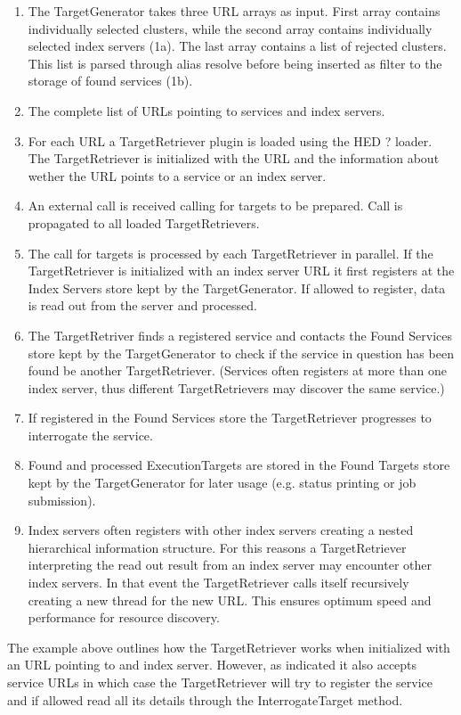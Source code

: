 \documentclass{book}
\begin{document}
\begin{enumerate}
\item{The TargetGenerator takes three URL arrays as input. First array contains individually selected clusters, while the 
second array contains individually selected index servers (1a). The last array contains a list of rejected clusters. This 
list is parsed through alias resolve before being inserted as filter to the storage of found services (1b).}
\item{The complete list of URLs pointing to services and index servers.}
\item{For each URL a TargetRetriever plugin is loaded using the HED ? loader. The TargetRetriever is initialized 
with the URL and the information about wether the URL points to a service or an index server.}
\item{An external call is received calling for targets to be prepared. Call is propagated to all loaded TargetRetrievers.}
\item{The call for targets is processed by each TargetRetriever in parallel. If the TargetRetriever is initialized with an 
index server URL it first registers at the Index Servers store kept by the TargetGenerator. If allowed to register, data 
is read out from the server and processed.}
\item{The TargetRetriver finds a registered service and contacts the Found Services store kept by the TargetGenerator to check 
if the service in question has been found be another TargetRetriever. (Services often registers at more than one index server, 
thus different TargetRetrievers may discover the same service.)}
\item{If registered in the Found Services store the TargetRetriever progresses to interrogate the service.}
\item{Found and processed ExecutionTargets are stored in the Found Targets store kept by the TargetGenerator for later usage 
(e.g. status printing or job submission).}
\item{Index servers often registers with other index servers creating a nested hierarchical information structure. For this 
reasons a TargetRetriever interpreting the read out result from an index server may encounter other index servers. In that 
event the TargetRetriever calls itself recursively creating a new thread for the new URL. This ensures optimum speed and 
performance for resource discovery.}
\end{enumerate}

The example above outlines how the TargetRetriever works when initialized with an URL pointing to and index server. However, 
as indicated it also accepts service URLs in which case the TargetRetriever will try to register the service and if allowed 
read all its details through the InterrogateTarget method.
\end{document}
